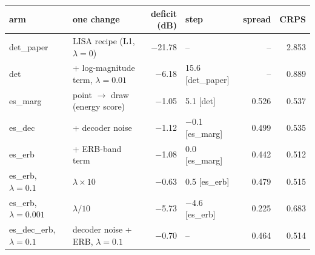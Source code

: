 \begin{tabular}{llrlrr}
\toprule
arm & one change & deficit (dB) & step & spread & CRPS \\
\midrule
det\_paper & LISA recipe (L1, $\lambda{=}0$) & $-$21.78 & -- & -- & 2.853 \\
det & + log-magnitude term, $\lambda{=}0.01$ & $-$6.18 & 15.6 [det\_paper] & -- & 0.889 \\
es\_marg & point $\to$ draw (energy score) & $-$1.05 & 5.1 [det] & 0.526 & 0.537 \\
es\_dec & + decoder noise & $-$1.12 & $-$0.1 [es\_marg] & 0.499 & 0.535 \\
es\_erb & + ERB-band term & $-$1.08 & 0.0 [es\_marg] & 0.442 & 0.512 \\
es\_erb, $\lambda{=}0.1$ & $\lambda \times 10$ & $-$0.63 & 0.5 [es\_erb] & 0.479 & 0.515 \\
es\_erb, $\lambda{=}0.001$ & $\lambda / 10$ & $-$5.73 & $-$4.6 [es\_erb] & 0.225 & 0.683 \\
es\_dec\_erb, $\lambda{=}0.1$ & decoder noise + ERB, $\lambda{=}0.1$ & $-$0.70 & -- & 0.464 & 0.514 \\
\bottomrule
\end{tabular}
